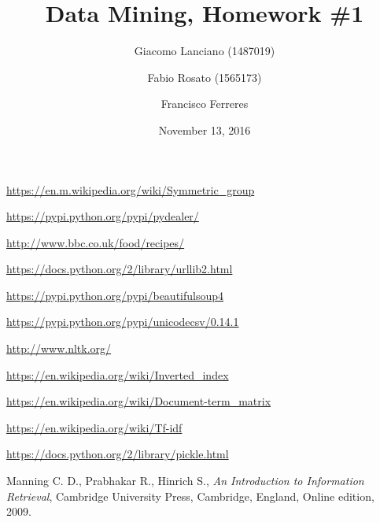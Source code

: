 \documentclass{article}
\title{Data Mining, Homework \#1}
\author{Giacomo Lanciano (1487019) \and Fabio Rosato (1565173) \and Francisco Ferreres}
\date{November 13, 2016}
\begin{document}
\maketitle
\tableofcontents
{}

\newpage
{}


\newpage


\newpage


\newpage


\newpage
{}
\begin{thebibliography}{9}

	\url{https://en.m.wikipedia.org/wiki/Symmetric_group}
	
	\url{https://pypi.python.org/pypi/pydealer/}
	
	\url{http://www.bbc.co.uk/food/recipes/}
	
	\url{https://docs.python.org/2/library/urllib2.html}
	
	\url{https://pypi.python.org/pypi/beautifulsoup4}
	
	\url{https://pypi.python.org/pypi/unicodecsv/0.14.1}
	
	\url{http://www.nltk.org/}
	
	\url{https://en.wikipedia.org/wiki/Inverted_index}
	
	\url{https://en.wikipedia.org/wiki/Document-term_matrix}
	
	\url{https://en.wikipedia.org/wiki/Tf-idf}
	
	\url{https://docs.python.org/2/library/pickle.html}
	
	Manning C. D., Prabhakar R., Hinrich S.,
	\emph{An Introduction to Information Retrieval},
	Cambridge University Press, Cambridge, England,
	Online edition,
	2009.

\end{thebibliography}
\end{document}
